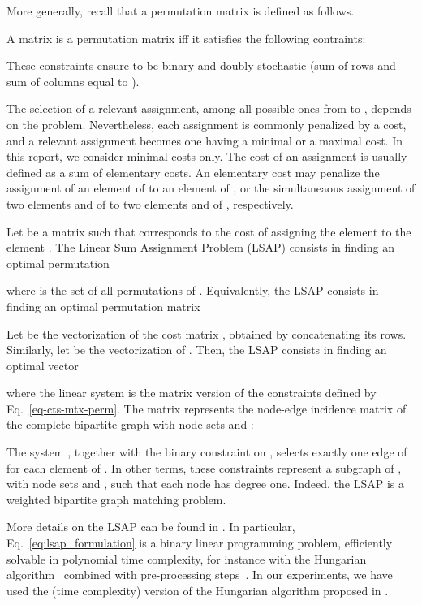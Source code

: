 More generally, recall that a permutation matrix is defined as follows.
\begin{definition}\label{def:permutationmatrix}
A  matrix  is a permutation matrix iff it satisfies the following contraints:

\end{definition}
These constraints ensure  to be binary and doubly stochastic (sum of rows and sum of columns equal to ).

The selection of a relevant assignment, among all possible ones from  to , depends on the problem. Nevertheless, each assignment is commonly penalized by a cost, and a relevant assignment becomes one having a minimal or a maximal cost. In this report, we consider minimal costs only. The cost of an assignment is usually defined as a sum of elementary costs. An elementary cost may penalize the assignment of an element of  to an element of , or the simultaneaous assignment of two elements  and  of  to two elements  and  of , respectively.

\begin{definition}\label{def:lsap}
Let  be a matrix such that  corresponds to the cost of assigning the element  to the element . The Linear Sum Assignment Problem (LSAP) consists in finding
an optimal permutation 

where  is the set of all permutations of . Equivalently, the LSAP consists in finding an optimal  permutation matrix

\end{definition}


Let  be the vectorization of the cost matrix , obtained by concatenating its rows. Similarly, let  be the vectorization of . Then, the LSAP consists in finding an optimal vector

where the linear system  is the matrix version of the constraints defined by Eq.~\ref{eq-cts-mtx-perm}. The matrix  represents the node-edge incidence matrix of the complete bipartite graph  with node sets  and :

The system , together with the binary constraint on , selects exactly one edge of  for each element of . In other terms, these constraints represent a subgraph of , with node sets  and , such that each node has degree one. Indeed, the LSAP is a weighted bipartite graph matching problem.

More details on the LSAP can be found in \cite{sier01,bur09}. In particular, Eq.~\ref{eq:lsap_formulation} is a binary linear programming problem, efficiently solvable in polynomial time complexity, for instance with the Hungarian  algorithm~\cite{Kuhn1955,Munkres1957,law76} combined with pre-processing steps~\cite{Jonker1987}. In our experiments, we have used the  (time complexity) version of the Hungarian algorithm proposed in \cite{law76,bur09}.

